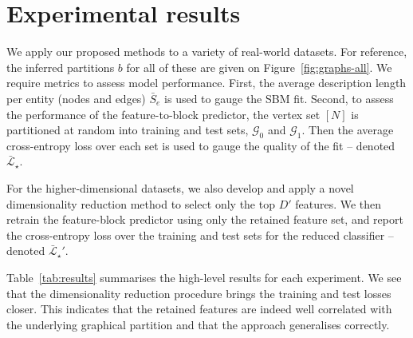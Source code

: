 \section{Experimental results}
\label{sec:experiments}

We apply our proposed methods to a variety of real-world datasets.
For reference, the inferred partitions $b$ for all of these are given on Figure~\ref{fig:graphs-all}.
We require metrics to assess model performance.
%
First, the average
description length per entity (nodes and edges) 
$\bar{S}_e$ 
is used to gauge the SBM fit.
%
Second, to assess the performance of the feature-to-block predictor, 
the vertex set $[N]$ 
is partitioned at random into training and test sets, $\mathcal{G}_0$ and $\mathcal{G}_1$. 
Then the average cross-entropy loss 
over each set is used to gauge the quality of the fit -- denoted $\bar{\mathcal{L}}_\star$.

For the higher-dimensional datasets, we also develop and apply a novel 
dimensionality reduction method to select only the top $D'$ features.  
We then retrain the feature-block predictor using only the retained 
feature set, and report the cross-entropy loss over the training and 
test sets for the reduced classifier -- 
denoted $\bar{\mathcal{L}}_\star'$.

Table~\ref{tab:results} summarises the high-level results for each experiment. 
We see that the dimensionality reduction procedure 
brings the training and test losses closer. This indicates that
the retained features
are indeed well correlated with the underlying graphical 
partition and that the approach generalises correctly. 

